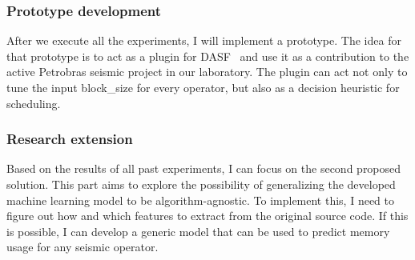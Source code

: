 \subsubsection{Prototype development}

After we execute all the experiments, I will implement a prototype.
The idea for that prototype is to act as a plugin for DASF~\cite{dasf} and use it as a contribution to the active Petrobras seismic project in our laboratory.
The plugin can act not only to tune the input block\_size for every operator, but also as a decision heuristic for scheduling.

\subsubsection{Research extension}

Based on the results of all past experiments, I can focus on the second proposed solution.
This part aims to explore the possibility of generalizing the developed machine learning model to be algorithm-agnostic.
To implement this, I need to figure out how and which features to extract from the original source code.
If this is possible, I can develop a generic model that can be used to predict memory usage for any seismic operator.
